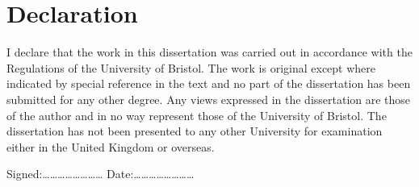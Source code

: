 
\chapter{Declaration}

I declare that the work in this dissertation was carried out in accordance with the Regulations of the University of Bristol.
The work is original except where indicated by special reference in the text and no part of the dissertation has been submitted
for any other degree. Any views expressed in the dissertation are those of the author and in no way represent those of the
University of Bristol. The dissertation has not been presented to any other University for examination either in the United
Kingdom or overseas.



Signed:\ldots\ldots\ldots\ldots\ldots\ldots\ldots\ldots
Date:\ldots\ldots\ldots\ldots\ldots\ldots\ldots\ldots

